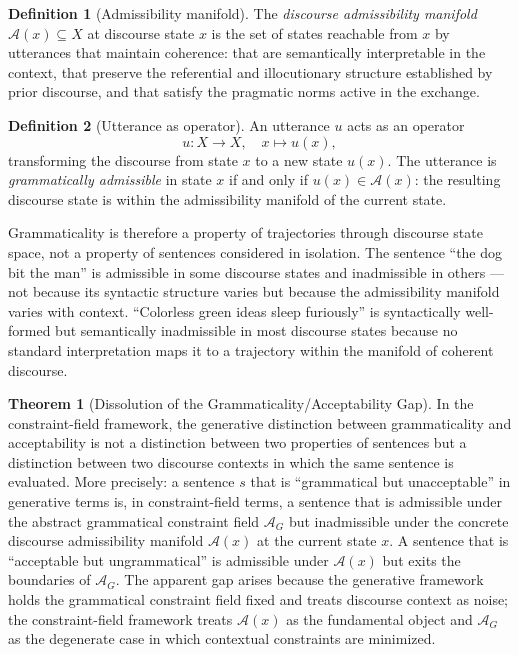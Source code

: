 \documentclass[11pt, a4paper]{article}
\theoremstyle{definition}
\newtheorem{definition}{Definition}
\newtheorem{theorem}{Theorem}
\theoremstyle{remark}
\begin{document}
\begin{definition}[Admissibility manifold]
The \textit{discourse admissibility manifold} $\mathcal{A}(x) \subseteq X$
at discourse state $x$ is the set of states reachable from $x$ by utterances
that maintain coherence: that are semantically interpretable in the context,
that preserve the referential and illocutionary structure established by
prior discourse, and that satisfy the pragmatic norms active in the exchange.
\end{definition}

\begin{definition}[Utterance as operator]
An utterance $u$ acts as an operator
\[
u: X \to X, \quad x \mapsto u(x),
\]
transforming the discourse from state $x$ to a new state $u(x)$. The utterance
is \textit{grammatically admissible} in state $x$ if and only if $u(x) \in
\mathcal{A}(x)$: the resulting discourse state is within the admissibility
manifold of the current state.
\end{definition}

Grammaticality is therefore a property of trajectories through discourse
state space, not a property of sentences considered in isolation. The sentence
``the dog bit the man'' is admissible in some discourse states and inadmissible
in others --- not because its syntactic structure varies but because the
admissibility manifold varies with context. ``Colorless green ideas sleep
furiously'' is syntactically well-formed but semantically inadmissible in
most discourse states because no standard interpretation maps it to a
trajectory within the manifold of coherent discourse.

\begin{theorem}[Dissolution of the Grammaticality/Acceptability Gap]
In the constraint-field framework, the generative distinction between
grammaticality and acceptability is not a distinction between two properties
of sentences but a distinction between two discourse contexts in which the
same sentence is evaluated. More precisely: a sentence $s$ that is
``grammatical but unacceptable'' in generative terms is, in constraint-field
terms, a sentence that is admissible under the abstract grammatical constraint
field $\mathcal{A}_G$ but inadmissible under the concrete discourse
admissibility manifold $\mathcal{A}(x)$ at the current state $x$. A sentence
that is ``acceptable but ungrammatical'' is admissible under $\mathcal{A}(x)$
but exits the boundaries of $\mathcal{A}_G$. The apparent gap arises because
the generative framework holds the grammatical constraint field fixed and
treats discourse context as noise; the constraint-field framework treats
$\mathcal{A}(x)$ as the fundamental object and $\mathcal{A}_G$ as the
degenerate case in which contextual constraints are minimized.
\end{theorem}
\end{document}
